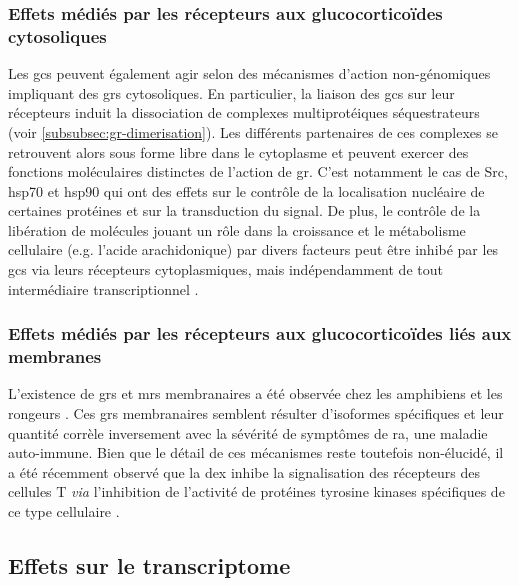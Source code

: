 \documentclass[../main.tex]{subfiles}
\begin{document}
		\subsubsection{Effets médiés par les récepteurs aux glucocorticoïdes cytosoliques}
			Les \glspl{gc} peuvent également agir selon des mécanismes d'action non-génomiques impliquant des \glspl{gr} cytosoliques.
			En particulier, la liaison des \glspl{gc} sur leur récepteurs induit la dissociation de complexes multiprotéiques séquestrateurs (voir \autoref{subsubsec:gr-dimerisation}).
			Les différents partenaires de ces complexes se retrouvent alors sous forme libre dans le cytoplasme et peuvent exercer des fonctions moléculaires distinctes de l'action de \gls{gr}.
			C'est notamment le cas de \gls{Src}, \gls{hsp70} et \gls{hsp90} \citep{Croxtall2000,Marchetti2003,Tumlin1997} qui ont des effets sur le contrôle de la localisation nucléaire de certaines protéines et sur la transduction du signal.
			De plus, le contrôle de la libération de molécules jouant un rôle dans la croissance et le métabolisme cellulaire (e.g. l'acide arachidonique) par divers facteurs peut être inhibé par les \glspl{gc} via leurs récepteurs cytoplasmiques, mais indépendamment de tout intermédiaire transcriptionnel \citep{Croxtall2000}.

		\subsubsection{Effets médiés par les récepteurs aux glucocorticoïdes liés aux membranes}
			L'existence de \glspl{gr} et \glspl{mr} membranaires a été observée chez les amphibiens et les rongeurs \citep{Orchinik1991,Gametchu1999}.
			Ces \glspl{gr} membranaires semblent résulter d'isoformes spécifiques \citep{Bartholome2004} et leur quantité corrèle inversement avec la sévérité de symptômes de \gls{ra}, une maladie auto-immune.
			Bien que le détail de ces mécanismes reste toutefois non-élucidé, il a été récemment observé que la \gls{dex} inhibe la signalisation des récepteurs des cellules T \textit{via} l'inhibition de l'activité de protéines tyrosine kinases spécifiques de ce type cellulaire \citep{Lowenberg2006}.


	\subsection{Effets sur le transcriptome}
\end{document}
